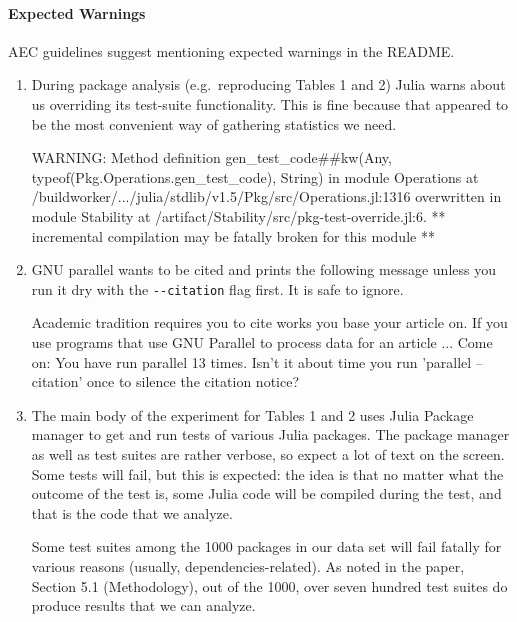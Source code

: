 \documentclass[
]{article}
\begin{document}
\hypertarget{expected-warnings}{%
\paragraph{Expected Warnings}\label{expected-warnings}}

AEC guidelines suggest mentioning expected warnings in the README.

\begin{enumerate}
\def\labelenumi{\arabic{enumi}.}
\item
  During package analysis (e.g.~reproducing Tables 1 and 2) Julia warns
  about us overriding its test-suite functionality. This is fine because
  that appeared to be the most convenient way of gathering statistics we
  need.

\begin{verbnobox}[\small]
WARNING: Method definition gen_test_code##kw(Any, typeof(Pkg.Operations.gen_test_code), String)
  in module Operations at /buildworker/.../julia/stdlib/v1.5/Pkg/src/Operations.jl:1316
  overwritten in module Stability at /artifact/Stability/src/pkg-test-override.jl:6.
  ** incremental compilation may be fatally broken for this module **
\end{verbnobox}
\item
  GNU parallel wants to be cited and prints the following message unless
  you run it dry with the \texttt{-\/-citation} flag first. It is safe
  to ignore.

\begin{verbnobox}[\small]
Academic tradition requires you to cite works you base your article on.
If you use programs that use GNU Parallel to process data for an article
...
Come on: You have run parallel 13 times. Isn't it about time 
you run 'parallel --citation' once to silence the citation notice?
\end{verbnobox}
\item
  The main body of the experiment for Tables 1 and 2 uses Julia Package
  manager to get and run tests of various Julia packages. The package
  manager as well as test suites are rather verbose, so expect a lot of
  text on the screen. Some tests will fail, but this is expected: the
  idea is that no matter what the outcome of the test is, some Julia code
  will be compiled during the test, and that is the code that we analyze.

  Some test suites among the 1000 packages in our data set will fail fatally for
  various reasons (usually, dependencies-related). As noted in the
  paper, Section 5.1 (Methodology), out of the 1000, over seven hundred test
  suites do produce results that we can analyze.
\end{enumerate}
\end{document}
